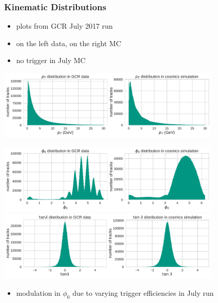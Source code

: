 \documentclass[18pt]{beamer}
\begin{document}
\begin{frame}
  \frametitle{Kinematic Distributions}
  \begin{itemize}
    \item plots from GCR July 2017 run
    \item on the left data, on the right MC
    \item no trigger in July MC

    \end{itemize}
    \begin{center}
      \includegraphics[width=0.8\textwidth]{figures/distributions/gcr_pt_distribution_uncut.pdf}\\
    \end{center}
  \end{frame}

  \begin{frame}
    \begin{center}
      \includegraphics[width=0.8\textwidth]{figures/distributions/gcr_phi0_distribution_uncut.pdf}\\
      \includegraphics[width=0.8\textwidth]{figures/distributions/gcr_tan_lambda_distribution_uncut.pdf}
    \end{center}

    \begin{itemize}
    \item modulation in $\phi_0$ due to varying trigger efficiencies in July run
    \end{itemize}
  \end{frame}
\end{document}
